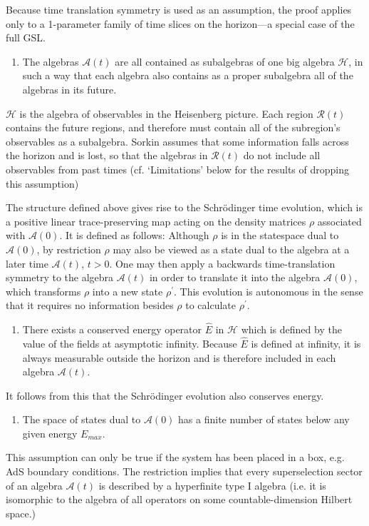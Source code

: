 \documentclass[12pt]{article}
\begin{document}
\noindent
Because time translation symmetry is used as an assumption, the proof applies only to a 1-parameter family of time slices on the horizon---a special case of the full GSL.
\begin{enumerate}
\setcounter{enumi}{\value{comment}}

\item The algebras $\mathcal{A}(t)$ are all contained as subalgebras of one big algebra $\mathcal{H}$, in such a way that each algebra also contains as a proper subalgebra all of the algebras in its future.

\setcounter{comment}{\value{enumi}}
\end{enumerate}
\noindent
$\mathcal{H}$ is the algebra of observables in the Heisenberg picture.  Each region $\mathcal{R}(t)$ contains the future regions, and therefore must contain all of the subregion's observables as a subalgebra.  Sorkin assumes that some information falls across the horizon and is lost, so that the algebras in $\mathcal{R}(t)$ do not include all observables from past times (cf. `Limitations' below for the results of dropping this assumption)

The structure defined above gives rise to the Schr\"{o}dinger time evolution, which is a positive linear trace-preserving map acting on the density matrices $\rho$ associated with $\mathcal{A}(0)$.  It is defined as follows: Although $\rho$ is in the statespace dual to $\mathcal{A}(0)$, by restriction $\rho$ may also be viewed as a state dual to the algebra at a later time $\mathcal{A}(t)$, $t > 0$.  One may then apply a backwards time-translation symmetry to the algebra $\mathcal{A}(t)$ in order to translate it into the algebra $\mathcal{A}(0)$, which transforms $\rho$ into a new state $\rho^\prime$.  This evolution is autonomous in the sense that it requires no information besides $\rho$ to calculate $\rho^\prime$.
\begin{enumerate}
\setcounter{enumi}{\value{comment}}

\item There exists a conserved energy operator $\hat{E}$ in $\mathcal{H}$ which is defined by the value of the fields at asymptotic infinity.  Because $\hat{E}$ is defined at infinity, it is always measurable outside the horizon and is therefore included in each algebra $\mathcal{A}(t)$.

\setcounter{comment}{\value{enumi}}
\end{enumerate}
\noindent
It follows from this that the Schr\"{o}dinger evolution also conserves energy.
\begin{enumerate}
\setcounter{enumi}{\value{comment}}

\item The space of states dual to $\mathcal{A}(0)$ has a finite number of states below any given energy $E_{max}$.
\end{enumerate}
\noindent
This assumption can only be true if the system has been placed in a box, e.g. AdS boundary conditions.  The restriction implies that every superselection sector of an algebra $\mathcal{A}(t)$ is described by a hyperfinite type I algebra (i.e. it is isomorphic to the algebra of all operators on some countable-dimension Hilbert space.)
\end{document}
